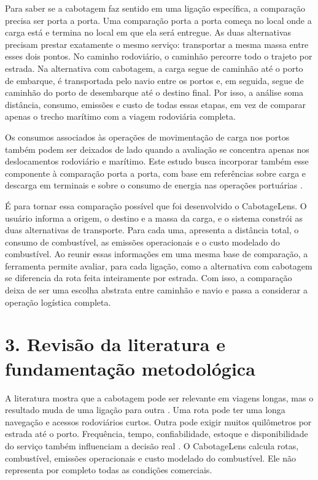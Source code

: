 \documentclass[brazil,]{article}
\let\oldsection\section
\renewcommand{\section}{\Needspace{14\baselineskip}\oldsection}
\begin{document}
Para saber se a cabotagem faz sentido em uma ligação específica, a
comparação precisa ser porta a porta. Uma comparação porta a porta
começa no local onde a carga está e termina no local em que ela será
entregue. As duas alternativas precisam prestar exatamente o mesmo
serviço: transportar a mesma massa entre esses dois pontos. No caminho
rodoviário, o caminhão percorre todo o trajeto por estrada. Na
alternativa com cabotagem, a carga segue de caminhão até o porto de
embarque, é transportada pelo navio entre os portos e, em seguida, segue
de caminhão do porto de desembarque até o destino final. Por isso, a
análise soma distância, consumo, emissões e custo de todas essas etapas,
em vez de comparar apenas o trecho marítimo com a viagem rodoviária
completa.

Os consumos associados às operações de movimentação de carga nos portos
também podem ser deixados de lado quando a avaliação se concentra apenas
nos deslocamentos rodoviário e marítimo. Este estudo busca incorporar
também esse componente à comparação porta a porta, com base em
referências sobre carga e descarga em terminais e sobre o consumo de
energia nas operações portuárias
\parencite{shipops2022,rtg2017,workbookdados}.

É para tornar essa comparação possível que foi desenvolvido o
CabotageLens. O usuário informa a origem, o destino e a massa da carga,
e o sistema constrói as duas alternativas de transporte. Para cada uma,
apresenta a distância total, o consumo de combustível, as emissões
operacionais e o custo modelado do combustível. Ao reunir essas
informações em uma mesma base de comparação, a ferramenta permite
avaliar, para cada ligação, como a alternativa com cabotagem se
diferencia da rota feita inteiramente por estrada. Com isso, a
comparação deixa de ser uma escolha abstrata entre caminhão e navio e
passa a considerar a operação logística completa.

\hypertarget{revisuxe3o-da-literatura-e-fundamentauxe7uxe3o-metodoluxf3gica}{%
\section{3. Revisão da literatura e fundamentação
metodológica}\label{revisuxe3o-da-literatura-e-fundamentauxe7uxe3o-metodoluxf3gica}}

A literatura mostra que a cabotagem pode ser relevante em viagens
longas, mas o resultado muda de uma ligação para outra \parencite{icct2022}.
Uma rota pode ter uma longa navegação e acessos rodoviários curtos.
Outra pode exigir muitos quilômetros por estrada até o porto.
Frequência, tempo, confiabilidade, estoque e disponibilidade do serviço
também influenciam a decisão real \parencite{competitiveness2024}. O
CabotageLens calcula rotas, combustível, emissões operacionais e custo
modelado do combustível. Ele não representa por completo todas as
condições comerciais.
\end{document}
